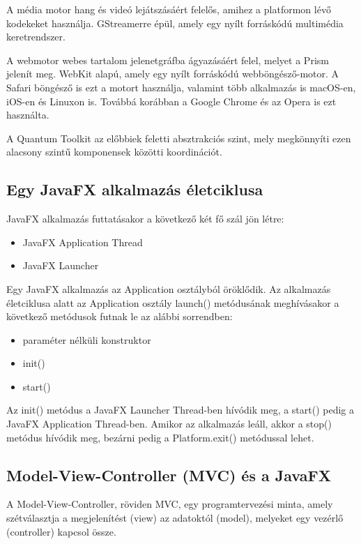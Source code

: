 A média motor hang és videó lejátszásáért felelős, amihez a platformon lévő kodekeket használja. GStreamerre épül, amely egy nyílt forráskódú multimédia keretrendszer. 

A webmotor webes tartalom jelenetgráfba ágyazásáért felel, melyet a Prism jelenít meg. WebKit alapú, amely egy nyílt forráskódú webböngésző-motor. A Safari böngésző is ezt a motort használja, valamint több alkalmazás is macOS-en, iOS-en és Linuxon is. Továbbá korábban a Google Chrome és az Opera is ezt használta. 

A Quantum Toolkit az előbbiek feletti absztrakciós szint, mely megkönnyíti ezen alacsony szintű komponensek közötti koordinációt. 

\subsection*{Egy JavaFX alkalmazás életciklusa}

JavaFX alkalmazás futtatásakor a következő két fő szál jön létre: 

\begin{itemize}
\item JavaFX Application Thread 
\item JavaFX Launcher 
\end{itemize}

Egy JavaFX alkalmazás az Application osztályból öröklődik. Az alkalmazás életciklusa alatt az Application osztály launch() metódusának meghívásakor a következő metódusok futnak le az alábbi sorrendben: 

\begin{itemize}
\item paraméter nélküli konstruktor 
\item init() 
\item start() 
\end{itemize}

Az init() metódus a JavaFX Launcher Thread-ben hívódik meg, a start() pedig a JavaFX Application Thread-ben. Amikor az alkalmazás leáll, akkor a stop() metódus hívódik meg, bezárni pedig a Platform.exit() metódussal lehet.  

\subsection*{Model-View-Controller (MVC) és a JavaFX}

A Model-View-Controller, röviden MVC, egy programtervezési minta, amely szétválasztja a megjelenítést (view) az adatoktól (model), melyeket egy vezérlő (controller) kapcsol össze. 

